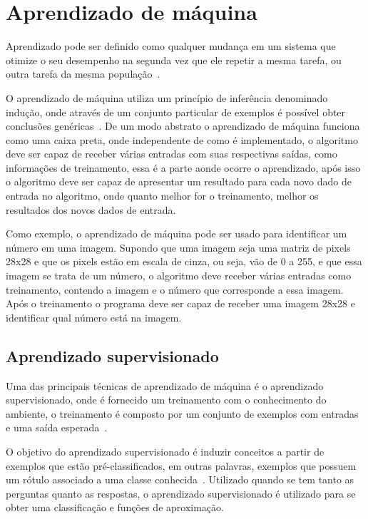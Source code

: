 \section{Aprendizado de máquina}

Aprendizado pode ser definido como qualquer mudança em um sistema que
otimize o seu desempenho na segunda vez que ele repetir a mesma tarefa,
ou outra tarefa da mesma população~\cite{custodio2010aprendizadomaquina}.

O aprendizado de máquina utiliza um princípio de inferência denominado
indução, onde através de um conjunto particular de exemplos é possível
obter conclusões genéricas~\cite{bruno2010aprendizadomaquina}. De um modo
abstrato o aprendizado de máquina funciona como uma caixa preta, onde
independente de como é implementado, o algoritmo deve ser capaz de receber
várias entradas com suas respectivas saídas, como informações de treinamento,
essa é a parte aonde ocorre o aprendizado, após isso o algoritmo deve
ser capaz de apresentar um resultado para cada novo dado de entrada no
algoritmo, onde quanto melhor for o treinamento, melhor os resultados
dos novos dados de entrada.

Como exemplo, o aprendizado de máquina pode ser usado para identificar
um número em uma imagem. Supondo que uma imagem seja uma matriz de pixels
28x28 e que os pixels estão em escala de cinza, ou seja, vão de 0 a 255, e
que essa imagem se trata de um número, o algoritmo deve receber várias
entradas como treinamento, contendo a imagem e o número que corresponde a
essa imagem. Após o treinamento o programa deve ser capaz de
receber uma imagem 28x28 e identificar qual número está na imagem.

\subsection{Aprendizado supervisionado}

Uma das principais técnicas de aprendizado de máquina é o aprendizado
supervisionado, onde é fornecido um treinamento com o conhecimento do
ambiente, o treinamento é composto por um conjunto de exemplos com entradas
e uma saída esperada~\cite{bruno2010aprendizadomaquina}.

O objetivo do aprendizado supervisionado é induzir conceitos a partir de
exemplos que estão pré-classificados, em outras palavras, exemplos que
possuem um rótulo associado a uma classe conhecida~\cite{bruno2010aprendizadomaquina}.
Utilizado quando se tem tanto as perguntas quanto as respostas, o aprendizado
supervisionado é utilizado para se obter uma classificação e funções de aproximação.


